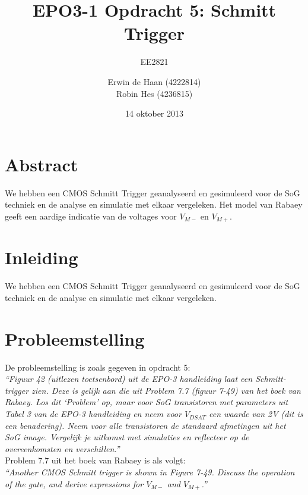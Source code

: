 \documentclass{scrartcl}  %
\author{Erwin {de Haan} (4222814)  \\{Robin Hes} (4236815)}
\title{EPO3-1 Opdracht 5: Schmitt Trigger}
\subtitle{EE2821}
\date{14 oktober 2013}
\begin{document}
\maketitle
\vspace{80 mm}

\section*{Abstract}
\label{sec:trig-abstr}
We hebben een CMOS Schmitt Trigger geanalyseerd en gesimuleerd voor de SoG techniek en de analyse en simulatie met elkaar vergeleken. Het model van Rabaey geeft een aardige indicatie van de voltages voor $V_{M-}$ en $V_{M+}$.

\newpage
\setlength{\cftbeforetoctitleskip}{-3em}
\tableofcontents

\section{Inleiding}
\label{sec:trig-inl}
We hebben een CMOS Schmitt Trigger geanalyseerd en gesimuleerd voor de SoG techniek en de analyse en simulatie met elkaar vergeleken.

\newpage
{}

\section{Probleemstelling}
\label{sec:trig-prob}
De probleemstelling is zoals gegeven in opdracht 5: \\
\textit{
``Figuur 42 (uitlezen toetsenbord) uit de EPO-3 handleiding laat een Schmitt-trigger zien. Deze is gelijk
aan die uit Problem 7.7 (figuur 7-49) van het boek van Rabaey. Los dit ‘Problem’ op, maar voor SoG
transistoren met parameters uit Tabel 3 van de EPO-3 handleiding en neem voor $V_{DSAT}$ een waarde van
2V (dit is een benadering). Neem voor alle transistoren de standaard afmetingen uit het SoG image.
Vergelijk je uitkomst met simulaties en reflecteer op de overeenkomsten en verschillen.''
}
\cite[2]{epo3-opdracht-5}
\\

Problem 7.7 uit het boek van Rabaey is als volgt: \\
\textit{
``Another CMOS Schmitt trigger is shown in Figure 7-49. Discuss the operation of the gate, and derive expressions for $V_{M-}$ and $V_{M+}$.''
}
\cite[367]{rabaey-integrated-circuits}
\\
\end{document}
